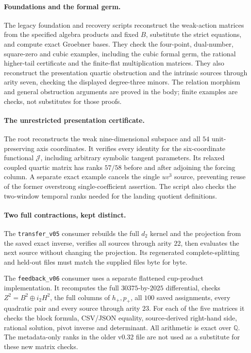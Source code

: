 \documentclass[11pt]{amsart}
\newcommand{\Q}{\mathbb Q}
\begin{document}
\paragraph{Foundations and the formal germ.}
The legacy foundation and recovery scripts reconstruct the weak-action
matrices from the specified algebra products and fixed $B$, substitute the
strict equations, and compute exact Groebner bases. They check the four-point,
dual-number, square-zero and cubic examples, including the cubic formal germ,
the rational higher-tail certificate and the finite-flat multiplication
matrices. They also reconstruct the presentation quartic obstruction and
the intrinsic sources through arity seven, checking the displayed degree-three
minors. The relation morphism and general obstruction arguments are proved
in the body; finite examples are checks, not substitutes for those proofs.

\paragraph{The unrestricted presentation certificate.}
The root  reconstructs the weak
nine-dimensional subspace and all $54$ unit-preserving axis coordinates.
It verifies every identity for the six-coordinate functional $\mathcal J$,
including arbitrary symbolic tangent parameters. Its relaxed coupled
quartic matrix has ranks $57/58$ before and after adjoining the forcing
column. A separate exact example cancels the single $uv^3$ source,
preventing reuse of the former overstrong single-coefficient assertion.
The script also checks the two-window temporal ranks needed for the
landing quotient definitions.

\paragraph{Two full contractions, kept distinct.}
The \texttt{transfer\_v05} consumer rebuilds the full $d_2$ kernel and the
projection from the saved exact inverse, verifies all sources through arity
$22$, then evaluates the next source without changing the projection.
Its regenerated complete-splitting and held-out files must match the supplied
files byte for byte.

The \texttt{feedback\_v06} consumer uses a separate flattened cup-product
implementation. It recomputes the full $30375$-by-$2025$ differential,
checks $Z^2=B^2\oplus i_2H^2$, the full columns of $h_+,p_+$, all $100$ saved
assignments, every quadratic pair and every source through arity $23$.
For each of the five matrices it checks the block formula, CSV/JSON equality,
source-derived right-hand side, rational solution, pivot inverse and determinant.
All arithmetic is exact over $\Q$.
The metadata-only ranks in the older v0.32 file are not used as a substitute
for these new matrix checks.
\end{document}

